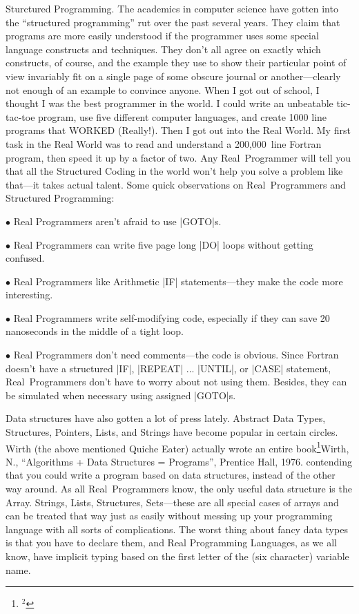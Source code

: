 \sect Sturctured Programming.
The academics in computer science have gotten into the ``structured
programming'' rut over the past several years. They claim that programs
are more easily understood if the programmer uses some special
language constructs and techniques. They don't all agree on exactly
which constructs, of course, and the example they use to show their
particular point of view invariably fit on a single page of some
obscure journal or another---clearly not enough of an example to
convince anyone. When I got out of school, I thought I was the best
programmer in the world. I could write an unbeatable tic-tac-toe
program, use five different computer languages, and create 1000 line
programs that WORKED (Really!). Then I got out into the Real World. My
first task in the Real World was to read and understand a 200,000~line
Fortran program, then speed it up by a factor of two. Any Real~Programmer
will tell you that all the Structured Coding in the world
won't help you solve a problem like that---it takes actual
talent. Some quick observations on Real~Programmers and Structured
Programming:
\startlist
\item{$\bullet$} Real Programmers aren't afraid to use |GOTO|s.
\item{$\bullet$} Real Programmers can write five page long |DO| loops without getting confused.
\item{$\bullet$} Real Programmers like Arithmetic |IF| statements---they make the code more interesting.
\item{$\bullet$} Real Programmers write self-modifying code, especially if they can save 20 nanoseconds in the middle of a tight loop.
\item{$\bullet$} Real Programmers don't need comments---the code is obvious.
\endlist
Since Fortran doesn't have a structured |IF|, |REPEAT| ... |UNTIL|,
or |CASE| statement, Real~Programmers don't have to worry about not using
them. Besides, they can be simulated when necessary using assigned
|GOTO|s.

Data structures have also gotten a lot of press lately. Abstract Data
Types, Structures, Pointers, Lists, and Strings have become popular in
certain circles. Wirth (the above mentioned Quiche Eater) actually
wrote an entire book\footnote{$^2$}{Wirth, N., ``Algorithms + Data Structures = Programs'', Prentice Hall, 1976.}
contending that you could write a program
based on data structures, instead of the other way around. As all
Real~Programmers know, the only useful data structure is the
Array. Strings, Lists, Structures, Sets---these are all special cases
of arrays and can be treated that way just as easily without messing
up your programming language with all sorts of complications. The
worst thing about fancy data types is that you have to declare them,
and Real Programming Languages, as we all know, have implicit typing
based on the first letter of the (six character) variable name.

